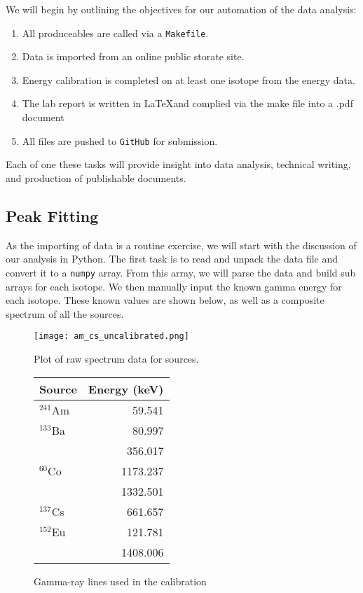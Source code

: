 We will begin by outlining the objectives for our automation of the data analysis:

\begin{enumerate}
  \item All produceables are called via a {\tt Makefile}.
  \item Data is imported from an online public storate site.
  \item Energy calibration is completed on at least one isotope from the energy data.
  \item The lab report is written in \LaTeX and complied via the make file into a .pdf document
  \item All files are pushed to {\tt GitHub} for submission.
\end{enumerate}

Each of one these tasks will provide insight into data analysis, technical writing, and
production of publishable documents.

\subsection{Peak Fitting}

As the importing of data is a routine exercise, we will start with the discussion of our analysis in Python.
The first task is to read and unpack the data file and convert it to a {\tt numpy} array. From this array, we will parse the data and
build sub arrays for each isotope. We then manually input the known gamma energy for each isotope. These known values are shown below, as well
as a composite spectrum of all the sources.



\begin{figure}
  \texttt{[image: am\_cs\_uncalibrated.png]}
  {
  \caption{Plot of raw spectrum data for sources.}
  }
  \begin{tabular}{l|r}
    \textbf{Source} & \textbf{Energy (keV)}\\
    \hline
    $^{241}$Am    &  59.541    \\
    $^{133}$Ba    &  80.997    \\
                  &  356.017   \\
    $^{60}$Co     &  1173.237  \\
                  &  1332.501  \\
    $^{137}$Cs    &  661.657   \\
    $^{152}$Eu    &  121.781   \\
                  &  1408.006  \\
  \end{tabular}
  \caption{Gamma-ray lines used in the calibration}
\end{figure}

